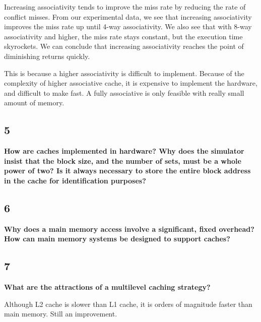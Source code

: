 \documentclass[letterpaper, 12pt, oneside]{memoir}
\begin{document}
Increasing associativity tends to improve the miss rate by reducing the rate of
conflict misses. From our experimental data, we see that increasing
associativity improves the miss rate up until 4-way associativity. We also see
that with 8-way associativity and higher, the miss rate stays constant, but the
execution time skyrockets. We can conclude that increasing associativity reaches
the point of diminishing returns quickly.

This is because a higher associativity is difficult to implement. Because of
the complexity of higher associative cache, it is expensive to implement the
hardware, and difficult to make fast. A fully associative is only feasible with
really small amount of memory.

\subsection{5}
\textbf{How are caches implemented in hardware? Why does the simulator insist
that the block size, and the number of sets, must be a whole power of two? Is it always
necessary to store the entire block address in the cache for identification
purposes?}


\subsection{6}
\textbf{Why does a main memory access involve a significant, fixed overhead? How
can main memory systems be designed to support caches?}


\subsection{7}
\textbf{What are the attractions of a multilevel caching strategy?}

Although L2 cache is slower than L1 cache, it is orders of magnitude faster
than main memory. Still an improvement.
\end{document}
